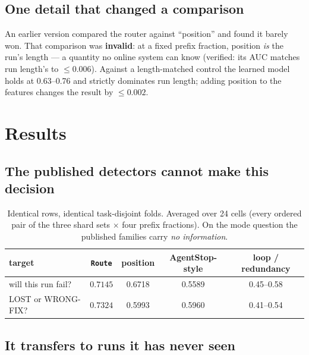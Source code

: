\documentclass[10pt]{article}
\newcommand{\code}[1]{\texttt{\small #1}}
\begin{document}
\subsection{One detail that changed a comparison}
An earlier version compared the router against ``position'' and found it barely won. That comparison
was \textbf{invalid}: at a fixed prefix fraction, position \emph{is} the run's length --- a quantity
no online system can know (verified: its AUC matches run length's to $\le 0.006$). Against a
length-matched control the learned model holds at 0.63--0.76 and strictly dominates run length;
adding position to the features changes the result by $\le 0.002$.

\section{Results}

\subsection{The published detectors cannot make this decision}

\begin{table}[h]
\centering\small
\begin{tabular}{lcccc}
\toprule
target & \code{Route} & position & AgentStop-style & loop / redundancy \\
\midrule
will this run fail? & $\mathbf{0.7145}$ & 0.6718 & 0.5589 & 0.45--0.58 \\
LOST or WRONG-FIX? & $\mathbf{0.7324}$ & 0.5993 & 0.5960 & 0.41--0.54 \\
\bottomrule
\end{tabular}
\caption{Identical rows, identical task-disjoint folds. Averaged over 24 cells (every ordered pair
of the three shard sets $\times$ four prefix fractions). On the mode question the published families
carry \emph{no information}.}
\end{table}

\subsection{It transfers to runs it has never seen}
\end{document}
